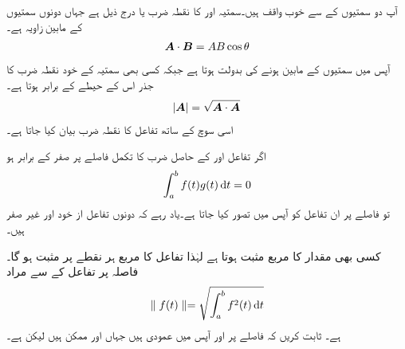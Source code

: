 آپ دو سمتیوں کے  سے خوب واقف ہیں۔سمتیہ  اور  کا نقطہ ضرب یا  درج ذیل ہے جہاں دونوں سمتیوں کے مابین زاویہ  ہے۔
\begin{align}
{\ensuremath{{\boldsymbol{A}}}} \cdot {\ensuremath{{\boldsymbol{B}}}}=A B \cos \theta
\end{align} 
آپس میں  سمتیوں کے مابین  ہونے کی بدولت  ہوتا ہے جبکہ کسی بھی سمتیہ کے خود نقطہ ضرب کا جذر اس کے حیطے  کے برابر ہوتا ہے۔
\begin{gather}
\begin{aligned}
 \abs{{{\boldsymbol{A}}}}=\sqrt{{{\boldsymbol{A}}} \cdot {\ensuremath{{\boldsymbol{A}}}}}
\end{aligned}
\end{gather}
اسی سوچ کے ساتھ تفاعل کا نقطہ ضرب بیان کیا جاتا ہے۔

اگر تفاعل  اور  کے حاصل ضرب کا تکمل  فاصلے پر صفر کے برابر ہو
\begin{align}
\int_a^b f(t)g(t) \dif t=0
\end{align}
تو  فاصلے پر ان تفاعل کو آپس میں  تصور کیا جاتا ہے۔یاد رہے کہ دونوں تفاعل از خود  اور غیر صفر ہیں۔

کسی بھی مقدار کا مربع مثبت ہوتا ہے لہٰذا تفاعل کا مربع  ہر نقطے پر مثبت ہو گا۔ فاصلہ   پر تفاعل کے   سے مراد 
\begin{align}
\parallel f(t) \parallel =\sqrt{\int_a^b f^2(t) \dif t}
\end{align}
ہے۔
ثابت کریں کہ   فاصلے پر  اور  آپس میں عمودی ہیں جہاں  اور  ممکن ہیں لیکن  ہے۔

